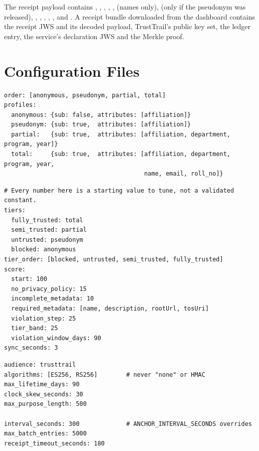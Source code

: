 The receipt payload contains , , , , ,  (names only),  (only if the pseudonym was released), , , , , ,  and . A receipt bundle downloaded from the dashboard contains the receipt JWS and its decoded payload, TrustTrail's public key set, the ledger entry, the service's declaration JWS and the Merkle proof.

\section{Configuration Files}
\label{app:config}

\begin{lstlisting}[caption={\code{config/profiles.yaml}}, label={lst:profiles}]
order: [anonymous, pseudonym, partial, total]
profiles:
  anonymous: {sub: false, attributes: [affiliation]}
  pseudonym: {sub: true,  attributes: [affiliation]}
  partial:   {sub: true,  attributes: [affiliation, department, program, year]}
  total:     {sub: true,  attributes: [affiliation, department, program, year,
                                       name, email, roll_no]}
\end{lstlisting}

\begin{lstlisting}[caption={\code{config/trust.yaml} (comments shortened)}, label={lst:trust}]
# Every number here is a starting value to tune, not a validated constant.
tiers:
  fully_trusted: total
  semi_trusted: partial
  untrusted: pseudonym
  blocked: anonymous
tier_order: [blocked, untrusted, semi_trusted, fully_trusted]
score:
  start: 100
  no_privacy_policy: 15
  incomplete_metadata: 10
  required_metadata: [name, description, rootUrl, tosUri]
  violation_step: 25
  tier_band: 25
  violation_window_days: 90
sync_seconds: 3
\end{lstlisting}

\begin{lstlisting}[caption={\code{config/declarations.yaml} and \code{config/anchoring.yaml}}, label={lst:decl-anchor}]
audience: trusttrail
algorithms: [ES256, RS256]        # never "none" or HMAC
max_lifetime_days: 90
clock_skew_seconds: 30
max_purpose_length: 500

interval_seconds: 300             # ANCHOR_INTERVAL_SECONDS overrides
max_batch_entries: 5000
receipt_timeout_seconds: 180
\end{lstlisting}

